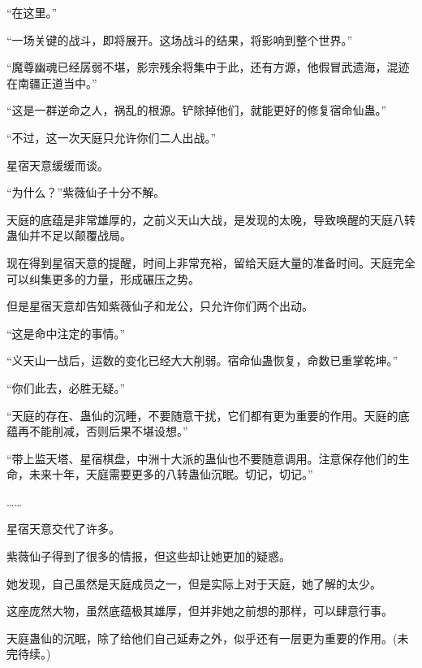 \begin{this_body}
“在这里。”

“一场关键的战斗，即将展开。这场战斗的结果，将影响到整个世界。”

“魔尊幽魂已经孱弱不堪，影宗残余将集中于此，还有方源，他假冒武遗海，混迹在南疆正道当中。”

“这是一群逆命之人，祸乱的根源。铲除掉他们，就能更好的修复宿命仙蛊。”

“不过，这一次天庭只允许你们二人出战。”

星宿天意缓缓而谈。

“为什么？”紫薇仙子十分不解。

天庭的底蕴是非常雄厚的，之前义天山大战，是发现的太晚，导致唤醒的天庭八转蛊仙并不足以颠覆战局。

现在得到星宿天意的提醒，时间上非常充裕，留给天庭大量的准备时间。天庭完全可以纠集更多的力量，形成碾压之势。

但是星宿天意却告知紫薇仙子和龙公，只允许你们两个出动。

“这是命中注定的事情。”

“义天山一战后，运数的变化已经大大削弱。宿命仙蛊恢复，命数已重掌乾坤。”

“你们此去，必胜无疑。”

“天庭的存在、蛊仙的沉睡，不要随意干扰，它们都有更为重要的作用。天庭的底蕴再不能削减，否则后果不堪设想。”

“带上监天塔、星宿棋盘，中洲十大派的蛊仙也不要随意调用。注意保存他们的生命，未来十年，天庭需要更多的八转蛊仙沉眠。切记，切记。”

……

星宿天意交代了许多。

紫薇仙子得到了很多的情报，但这些却让她更加的疑惑。

她发现，自己虽然是天庭成员之一，但是实际上对于天庭，她了解的太少。

这座庞然大物，虽然底蕴极其雄厚，但并非她之前想的那样，可以肆意行事。

天庭蛊仙的沉眠，除了给他们自己延寿之外，似乎还有一层更为重要的作用。(未完待续。)

\end{this_body}

